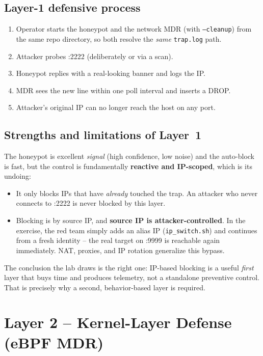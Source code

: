 \documentclass[11pt]{article}
\newcommand{\co}[1]{\texttt{#1}}
\begin{document}
\subsection{Layer-1 defensive process}
\begin{enumerate}[leftmargin=1.4em]
  \item Operator starts the honeypot and the network MDR (with
        \co{--cleanup}) from the same repo directory, so both resolve the
        \emph{same} \co{trap.log} path.
  \item Attacker probes :2222 (deliberately or via a scan).
  \item Honeypot replies with a real-looking banner and logs the IP.
  \item MDR sees the new line within one poll interval and inserts a DROP.
  \item Attacker's original IP can no longer reach the host on any port.
\end{enumerate}

\subsection{Strengths and limitations of Layer~1}
\label{sec:net-limits}
The honeypot is excellent \emph{signal} (high confidence, low noise) and the
auto-block is fast, but the control is fundamentally \textbf{reactive and
IP-scoped}, which is its undoing:
\begin{itemize}[leftmargin=1.4em]
  \item It only blocks IPs that have \emph{already} touched the trap. An
        attacker who never connects to :2222 is never blocked by this layer.
  \item Blocking is by source IP, and \textbf{source IP is attacker-controlled}.
        In the exercise, the red team simply adds an alias IP
        (\co{ip\_switch.sh}) and continues from a fresh identity --
        the real target on :9999 is reachable again immediately. NAT,
        proxies, and IP rotation generalize this bypass.
\end{itemize}
The conclusion the lab draws is the right one: IP-based blocking is a useful
\emph{first} layer that buys time and produces telemetry, not a standalone
preventive control. That is precisely why a second, behavior-based layer is
required.

\section{Layer 2 -- Kernel-Layer Defense (eBPF MDR)}
\label{sec:kernel}
\end{document}
